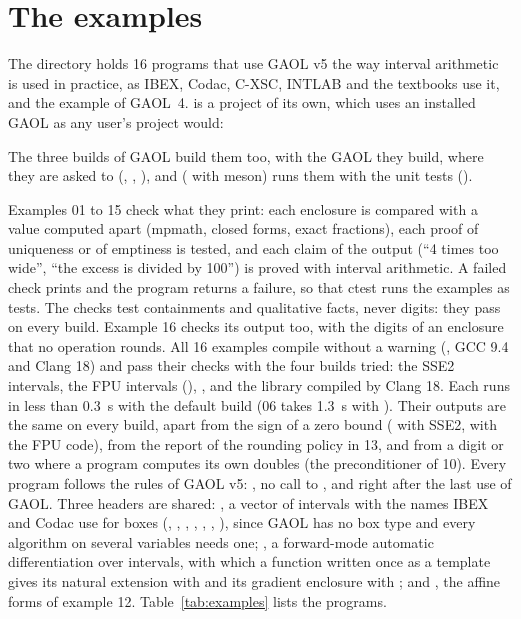 \documentclass[12pt,a4paper,twoside,openright]{book}
\begin{document}
\section{The examples}\label{sec:examples}
%

The directory  holds 16 programs that use GAOL v5 the way
interval arithmetic is used in practice, as IBEX, Codac, C-XSC, INTLAB and
the textbooks use it, and the example of GAOL~4. 
is a project of its own, which uses an installed GAOL as any user's project
would:

\begin{cmdshell}
\end{cmdshell}

\noindent
The three builds of GAOL build them too, with the GAOL they build, where
they are asked to (, ,
), and  ( with meson)
runs them with the unit tests ().

\medskip
Examples 01 to 15 check what they print:\newinvfive{} each enclosure is
compared with a value computed apart (mpmath, closed forms, exact
fractions), each proof of uniqueness or of emptiness is tested, and each
claim of the output (``4 times too wide'', ``the excess is divided by 100'')
is proved with interval arithmetic. A failed check prints
 and the program returns a failure, so that ctest runs
the examples as tests. The checks test containments and qualitative facts,
never digits: they pass on every build. Example 16 checks its output too,
with the digits of an enclosure that no operation rounds. All 16 examples
compile without a warning (, GCC 9.4 and Clang 18)
and pass their checks with the four builds tried: the SSE2 intervals, the
FPU intervals (), ,
and the library compiled by Clang 18. Each runs in less than 0.3~s with the
default build (06 takes 1.3~s with ). Their
outputs are the same on every build, apart from the sign of a zero bound
(\code{[-0, 4]} with SSE2, \code{[0, 4]} with the FPU code), from the report
of the rounding policy in 13, and from a digit or two where a program
computes its own doubles (the preconditioner of 10). Every program follows
the rules of GAOL v5: , no call to
, and  right after the last use of
GAOL. Three headers are shared: , a vector of intervals with
the names IBEX and Codac use for boxes (,
, , ,
, \code{\&}, \code{|}), since GAOL has no box type
and every algorithm on several variables needs one; , a
forward-mode automatic differentiation over intervals, with which a function
written once as a template gives its natural extension with 
and its gradient enclosure with ; and , the
affine forms of example 12. Table~\ref{tab:examples} lists the programs.
\end{document}
